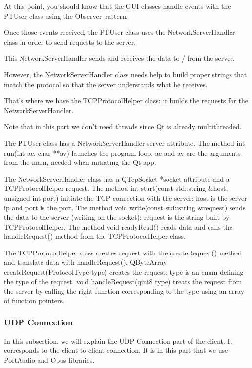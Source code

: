 \documentclass{article}
\begin{document}
 At this point, you should know that the GUI classes handle events with the PTUser class using the Observer pattern.
 \bigskip

 Once those events received, the PTUser class uses the NetworkServerHandler class in order to send requests to the server.

 This NetworkServerHandler sends and receives the data to / from the server.

 However, the NetworkServerHandler class needs help to build proper strings that match the protocol so that the server understands what he receives.

 That's where we have the TCPProtocolHelper class: it builds the requests for the NetworkServerHandler.

 Note that in this part we don't need threads since Qt is already multithreaded.
 \bigskip

 The PTUser class has a NetworkServerHandler server attribute.
 The method int run(int ac, char **av) launches the program loop: ac and av are the arguments from the main, needed when initiating the Qt app.

 \bigskip
 The NetworkServerHandler class has a QTcpSocket *socket attribute and a TCPProtocolHelper request.
 The method int start(const std::string &host, unsigned int port) initiate the TCP connection with the server: host is the server ip and port is the port.
 The method void write(const std::string &request) sends the data to the server (writing on the socket): request is the string built by TCPProtocolHelper.
 The method void readyRead() reads data and calls the handleRequest() method from the TCPProtocolHelper class.
 \bigskip

 The TCPProtocolHelper class creates request with the createRequest() method and translate data with handleRequest().
 QByteArray createRequest(ProtocolType type) creates the request: type is an enum defining the type of the request.
 void handleRequest(qint8 type) treats the request from the server by calling the right function corresponding to the type using an array of function pointers.

 \newpage

 \subsubsection{UDP Connection}

 In this subsection, we will explain the UDP Connection part of the client. It corresponds to the client to client connection.
 It is in this part that we use PortAudio and Opus libraries.
\end{document}
